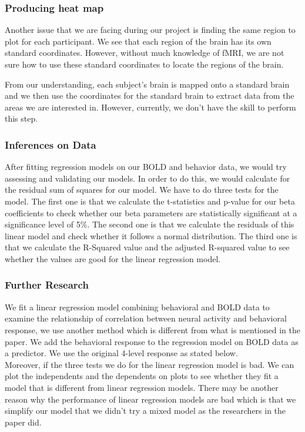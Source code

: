 \subsubsection{Producing heat map}

\indent \indent Another issue that we are facing during our project is finding the same region to plot for each participant. We see that each region of the brain has its own standard coordinates. However, without much knowledge of fMRI, we are not sure how to use these standard coordinates to locate the regions of the brain.

From our understanding, each subject's brain is mapped onto a standard brain and we then use the coordinates for the standard brain to extract data from the areas we are interested in. However, currently, we don't have the skill to perform this step.

\subsubsection{Inferences on Data}

After fitting regression models on our BOLD and behavior data, we would try assessing and validating our models. In order to do this, we would calculate for the residual sum of squares for our model. We have to do three tests for the model. The first one is that we calculate the t-statistics and p-value for our beta coefficients to check whether our beta parameters are statistically significant at a significance level of 5\%. The second one is that we calculate the residuals of this linear model and check whether it follows a normal distribution. The third one is that we calculate the R-Squared value and the adjusted R-squared value to see whether the values are good for the linear regression model.

\subsubsection{Further Research}

We fit a linear regression model combining behavioral and BOLD data to examine the relationship of correlation between neural activity and behavioral response, we use another method which is different from what is mentioned in the paper. We add the behavioral response to the regression model on BOLD data as a predictor. We use the original 4-level response as stated below. \\ 

Moreover, if the three tests we do for the linear regression model is bad. We can plot the independents and the dependents on plots to see whether they fit a model that is different from linear regression models. There may be another reason why the performance of linear regression models are bad which is that we simplify our model that we didn’t try a mixed model as the researchers in the paper did.

